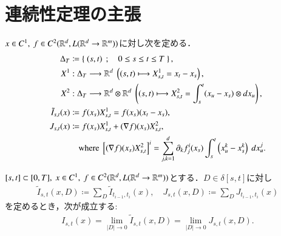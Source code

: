 \section{連続性定理の主張}
	\begin{screen}
		\begin{dfn}[記号の定義]
			$x \in C^1,\ f \in C^2(\mathbb{R}^d,L(\mathbb{R}^d \rightarrow \mathbb{R}^m))$に対し次を定める．
			\begin{align}
				\Delta_T &\coloneqq \Set{(s,t)}{0 \leq s \leq t \leq T}, \\
				X^1 &:\Delta_T \longrightarrow \R^d\ \left( (s,t) \longmapsto X^1_{s,t} = x_t - x_s \right), \\
				X^2 &:\Delta_T \longrightarrow \R^d \otimes \R^d\ \left( (s,t) \longmapsto X^2_{s,t} = \int_s^t (x_u - x_s) \otimes dx_u \right), \\
				\tilde{I}_{s,t}(x) &\coloneqq f(x_s)X^1_{s,t} = f(x_s)(x_t - x_s), \\
				J_{s,t}(x) &\coloneqq f(x_s)X^1_{s,t} + (\nabla f)(x_s)X^2_{s,t}, \\
					&\quad \mbox{where\ } \left[ (\nabla f)(x_s)X^2_{s,t} \right]^i = \sum_{j,k=1}^d \partial_k f^i_j(x_s) \int_s^t \left(x^k_u - x^k_s \right)\ dx^j_u.
			\end{align}
		\end{dfn}
	\end{screen}
	
	\begin{screen}
		\begin{thm}\label{thm:Riemann_Stieltjes_approximation}
			$[s,t] \subset [0,T],\ x \in C^1,\ f \in C^2(\mathbb{R}^d,L(\mathbb{R}^d \rightarrow \mathbb{R}^m))$とする．$D \in \delta[s,t]$に対し
			\begin{align}
				\tilde{I}_{s,t}(x,D) \coloneqq \sum_D \tilde{I}_{t_{i-1},t_i}(x),
				\quad J_{s,t}(x,D) \coloneqq \sum_D J_{t_{i-1},t_i}(x)
			\end{align}
			を定めるとき，次が成立する:
			\begin{align}
				I_{s,t}(x) = \lim_{|D| \to 0} \tilde{I}_{s,t}(x,D)
				= \lim_{|D| \to 0} J_{s,t}(x,D).
			\end{align}
		\end{thm}
	\end{screen}
	
